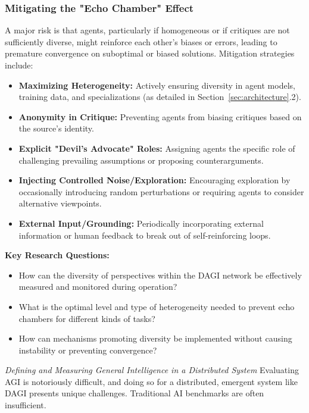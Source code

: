 \documentclass[12pt]{amsart}
\begin{document}
\subsubsection{Mitigating the "Echo Chamber" Effect}
\label{subsubsec:echo_chamber}
A major risk is that agents, particularly if homogeneous or if critiques are not sufficiently diverse, might reinforce each other's biases or errors, leading to premature convergence on suboptimal or biased solutions. Mitigation strategies include:
\begin{itemize}[leftmargin=*]
    \item \textbf{Maximizing Heterogeneity:} Actively ensuring diversity in agent models, training data, and specializations (as detailed in Section~\ref{sec:architecture}.2).
    \item \textbf{Anonymity in Critique:} Preventing agents from biasing critiques based on the source's identity.
    \item \textbf{Explicit "Devil's Advocate" Roles:} Assigning agents the specific role of challenging prevailing assumptions or proposing counterarguments.
    \item \textbf{Injecting Controlled Noise/Exploration:} Encouraging exploration by occasionally introducing random perturbations or requiring agents to consider alternative viewpoints.
    \item \textbf{External Input/Grounding:} Periodically incorporating external information or human feedback to break out of self-reinforcing loops.
\end{itemize}
\textbf{Key Research Questions:}
\begin{itemize}[leftmargin=*, label={--}]
    \item How can the diversity of perspectives within the DAGI network be effectively measured and monitored during operation?
    \item What is the optimal level and type of heterogeneity needed to prevent echo chambers for different kinds of tasks?
    \item How can mechanisms promoting diversity be implemented without causing instability or preventing convergence?
\end{itemize}

 \textit{Defining and Measuring General Intelligence in a Distributed System} 
\label{subsec:measuring_gi}
Evaluating AGI is notoriously difficult, and doing so for a distributed, emergent system like DAGI presents unique challenges. Traditional AI benchmarks are often insufficient.
\end{document}
